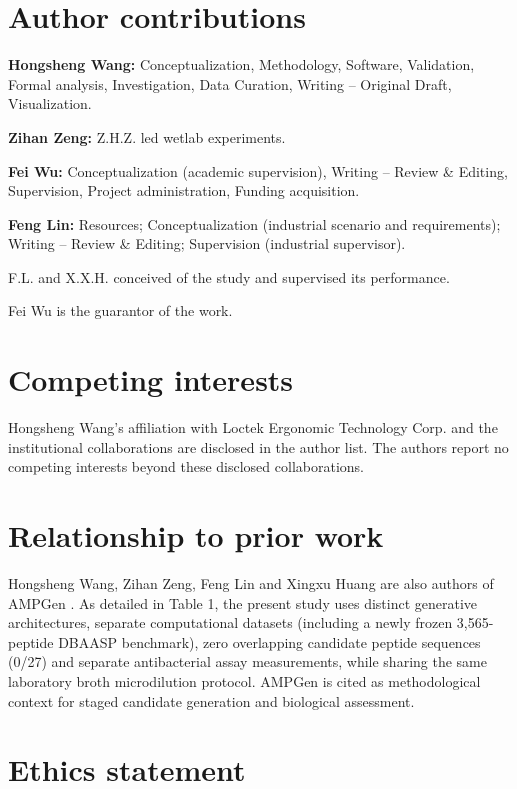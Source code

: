 \documentclass[unnumsec,webpdf,contemporary,large]{oup-authoring-template}
\newcommand{\rev}[1]{#1}
\begin{document}
\section*{Author contributions}

\textbf{Hongsheng Wang:} Conceptualization, Methodology, Software, Validation, Formal analysis, Investigation, Data Curation, Writing -- Original Draft, Visualization.

\textbf{Zihan Zeng:} Z.H.Z. led wetlab experiments.

\textbf{Fei Wu:} Conceptualization (academic supervision), Writing -- Review \& Editing, Supervision, Project administration, Funding acquisition.

\textbf{Feng Lin:} Resources; Conceptualization (industrial scenario and requirements); Writing -- Review \& Editing; Supervision (industrial supervisor).

F.L. and X.X.H. conceived of the study and supervised its performance.

Fei Wu is the guarantor of the work.

\section*{Competing interests}

Hongsheng Wang's affiliation with Loctek Ergonomic Technology Corp. and the institutional collaborations are disclosed in the author list. The authors report no competing interests beyond these disclosed collaborations.

\section*{Relationship to prior work}
Hongsheng Wang, Zihan Zeng, Feng Lin and Xingxu Huang are also authors of AMPGen \cite{ref9}. \rev{As detailed in Table 1, the present study uses distinct generative architectures, separate computational datasets (including a newly frozen 3,565-peptide DBAASP benchmark), zero overlapping candidate peptide sequences (0/27) and separate antibacterial assay measurements, while sharing the same laboratory broth microdilution protocol.} AMPGen is cited as methodological context for staged candidate generation and biological assessment.

\section*{Ethics statement}
\end{document}
